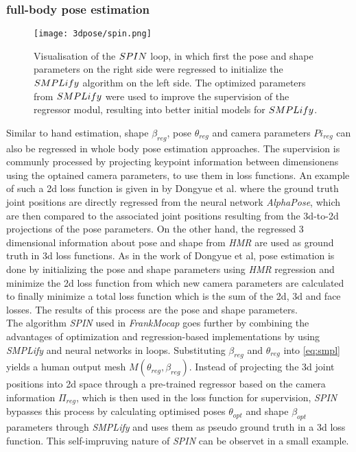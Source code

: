 \subsubsection{full-body pose estimation}
\begin{figure}[h]
	\centering
	\texttt{[image: 3dpose/spin.png]}
	\caption{Visualisation of the $\protect SPIN$ loop, in which first the pose and shape parameters on the right side were regressed to initialize the $\protect SMPLify$ algorithm on the left side. The optimized parameters from $\protect SMPLify$ were used to improve the supervision of the regressor modul, resulting into better initial models for $\protect SMPLify$. \cite{spin}}
	\label{fig:spin}
\end{figure}

Similar to hand estimation, shape $\beta_{reg}$, pose $\theta_{reg}$ and camera parameters $Pi_{reg}$ can also be regressed in whole body pose estimation approaches. The supervision is communly processed by projecting keypoint information between dimensionens using the optained camera parameters, to use them in loss functions. An example of such a 2d loss function is given in \cite{chen} by Dongyue et al. where the ground truth joint positions are directly regressed from the neural network \emph{AlphaPose}, which are then compared to the associated joint positions resulting from the 3d-to-2d projections of the pose parameters. On the other hand, the regressed 3 dimensional information about pose and shape from \emph{HMR} are used as ground truth in 3d loss functions. As in the work of Dongyue et al, pose estimation is done by initializing the pose and shape parameters using \emph{HMR} regression and minimize the 2d loss function from which new camera parameters are calculated to finally minimize a total loss function which is the sum of the 2d, 3d and face losses. The results of this process are the pose and shape parameters. \\
The algorithm \emph{SPIN} \cite{spin} used in \emph{FrankMocap} goes further by combining the advantages of optimization and regression-based implementations by using \emph{SMPLify} and neural networks in loops. Substituting $\beta_{reg}$ and $\theta_{reg}$ into \autoref{eq:smpl} yields a human output mesh $M(\theta_{reg},\beta_{reg})$. Instead of projecting the 3d joint positions into 2d space through a pre-trained regressor based on the camera information $\Pi_{reg}$, which is then used in the loss function for supervision, \emph{SPIN} bypasses this process by calculating optimised poses $\theta_{opt}$ and shape $\beta_{opt}$ parameters through \emph{SMPLify} and uses them as pseudo ground truth in a 3d loss function. This self-impruving nature of \emph{SPIN} can be observet in a small example. \\
